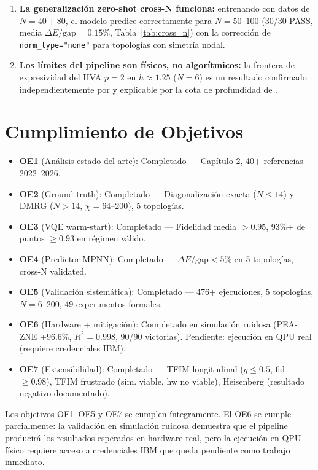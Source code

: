 \documentclass[11pt,a4paper,spanish]{book}
\begin{document}
\begin{enumerate}
    \item \textbf{La generalización zero-shot cross-N funciona:} entrenando con datos de $N = 40 + 80$, el modelo predice correctamente para $N = 50$--$100$ (30/30 PASS, media $\Delta E/\text{gap} = 0.15\%$, Tabla~\ref{tab:cross_n}) con la corrección de \texttt{norm\_type="none"} para topologías con simetría nodal.

    \item \textbf{Los límites del pipeline son físicos, no algorítmicos:} la frontera de expresividad del HVA $p = 2$ en $h \approx 1.25$ ($N = 6$) es un resultado confirmado independientemente por \citet{tripathi2026} y explicable por la cota de profundidad de \citet{sumeet2025}.
\end{enumerate}

\section{Cumplimiento de Objetivos}

\begin{itemize}
    \item \textbf{OE1} (Análisis estado del arte): Completado --- Capítulo 2, 40+ referencias 2022--2026.
    \item \textbf{OE2} (Ground truth): Completado --- Diagonalización exacta ($N \leq 14$) y DMRG ($N > 14$, $\chi = 64$--$200$), 5 topologías.
    \item \textbf{OE3} (VQE warm-start): Completado --- Fidelidad media $> 0.95$, 93\%+ de puntos $\geq 0.93$ en régimen válido.
    \item \textbf{OE4} (Predictor MPNN): Completado --- $\Delta E/\text{gap} < 5\%$ en 5 topologías, cross-N validated.
    \item \textbf{OE5} (Validación sistemática): Completado --- 476+ ejecuciones, 5 topologías, $N = 6$--$200$, 49 experimentos formales.
    \item \textbf{OE6} (Hardware + mitigación): Completado en simulación ruidosa (PEA-ZNE +96.6\%, $R^2 = 0.998$, 90/90 victorias). Pendiente: ejecución en QPU real (requiere credenciales IBM).
    \item \textbf{OE7} (Extensibilidad): Completado --- TFIM longitudinal ($g \leq 0.5$, fid $\geq 0.98$), TFIM frustrado (sim. viable, hw no viable), Heisenberg (resultado negativo documentado).
\end{itemize}

Los objetivos OE1--OE5 y OE7 se cumplen íntegramente. El OE6 se cumple parcialmente: la validación en simulación ruidosa demuestra que el pipeline producirá los resultados esperados en hardware real, pero la ejecución en QPU físico requiere acceso a credenciales IBM que queda pendiente como trabajo inmediato.
\end{document}
